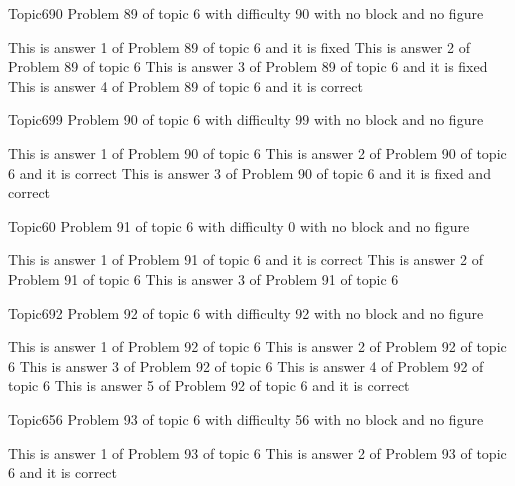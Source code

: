 \documentclass[master]{exam}
\begin{document}
\begin{problem}{Topic6}{90}
	Problem 89 of topic 6 with difficulty 90 with no block and no figure
	\begin{answers}
		\answer[fixed] This is answer 1 of Problem 89 of topic 6 and it is fixed
		\answer This is answer 2 of Problem 89 of topic 6 
		\answer[fixed] This is answer 3 of Problem 89 of topic 6 and it is fixed
		\answer[correct] This is answer 4 of Problem 89 of topic 6 and it is correct
	\end{answers}
\end{problem}

\begin{problem}{Topic6}{99}
	Problem 90 of topic 6 with difficulty 99 with no block and no figure
	\begin{answers}
		\answer This is answer 1 of Problem 90 of topic 6 
		\answer[correct] This is answer 2 of Problem 90 of topic 6 and it is correct
		 This is answer 3 of Problem 90 of topic 6 and it is fixed and correct
	\end{answers}
\end{problem}

\begin{problem}{Topic6}{0}
	Problem 91 of topic 6 with difficulty 0 with no block and no figure
	\begin{answers}
		\answer[correct] This is answer 1 of Problem 91 of topic 6 and it is correct
		\answer This is answer 2 of Problem 91 of topic 6 
		\answer This is answer 3 of Problem 91 of topic 6 
	\end{answers}
\end{problem}

\begin{problem}{Topic6}{92}
	Problem 92 of topic 6 with difficulty 92 with no block and no figure
	\begin{answers}
		\answer This is answer 1 of Problem 92 of topic 6 
		\answer This is answer 2 of Problem 92 of topic 6 
		\answer This is answer 3 of Problem 92 of topic 6 
		\answer This is answer 4 of Problem 92 of topic 6 
		\answer[correct] This is answer 5 of Problem 92 of topic 6 and it is correct
	\end{answers}
\end{problem}

\begin{problem}{Topic6}{56}
	Problem 93 of topic 6 with difficulty 56 with no block and no figure
	\begin{answers}
		\answer This is answer 1 of Problem 93 of topic 6 
		\answer[correct] This is answer 2 of Problem 93 of topic 6 and it is correct
	\end{answers}
\end{problem}
\end{document}
